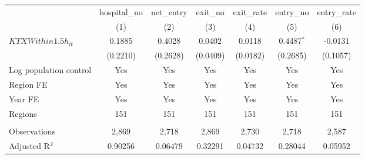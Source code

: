 \begingroup
\centering
\begin{tabular}{lcccccc}
   \toprule
                          & hospital\_no  & net\_entry  & exit\_no  & exit\_rate  & entry\_no    & entry\_rate \\    
                          & (1)           & (2)         & (3)       & (4)         & (5)          & (6)\\  
   \midrule 
   $KTXWithin1.5h_{it}$   & 0.1885        & 0.4028      & 0.0402    & 0.0118      & 0.4487$^{*}$ & -0.0131\\   
                          & (0.2210)      & (0.2628)    & (0.0409)  & (0.0182)    & (0.2685)     & (0.1057)\\   
   Log population control & Yes           & Yes         & Yes       & Yes         & Yes          & Yes\\  
   Region FE              & Yes           & Yes         & Yes       & Yes         & Yes          & Yes\\  
   Year FE                & Yes           & Yes         & Yes       & Yes         & Yes          & Yes\\  
   Regions                & 151           & 151         & 151       & 151         & 151          & 151\\  
    \\
   Observations           & 2,869         & 2,718       & 2,869     & 2,730       & 2,718        & 2,587\\  
   Adjusted R$^2$         & 0.90256       & 0.06479     & 0.32291   & 0.04732     & 0.28044      & 0.05952\\  
   \bottomrule
\end{tabular}
\par\endgroup
